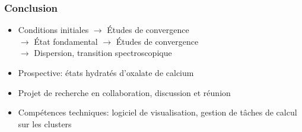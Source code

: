 \documentclass[french]{beamer}
\begin{document}

\begin{frame}
\frametitle{Conclusion}
\begin{itemize}
  \item Conditions initiales $\rightarrow$ Études de convergence\\ $\rightarrow$ État fondamental $\rightarrow$ Études de convergence\\ $\rightarrow$ Dispersion, transition spectroscopique
  \item Prospective: états hydratés d'oxalate de calcium  
  \item Projet de recherche en collaboration, discussion et réunion
  \item Compétences techniques: logiciel de visualisation, gestion de tâches de calcul sur les clusters
\end{itemize}

\end{frame}
\end{document}
